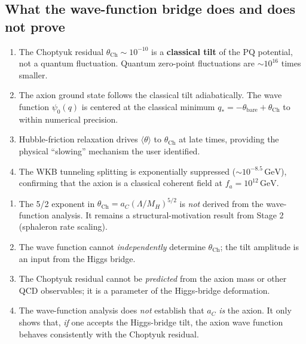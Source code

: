 \subsection{What the wave-function bridge does and does not prove}

\begin{keyfind}
\begin{enumerate}[leftmargin=*]
\item The Choptyuk residual $\theta_\mathrm{Ch} \sim 10^{-10}$ is a
\textbf{classical tilt} of the PQ potential, not a quantum
fluctuation.  Quantum zero-point fluctuations are $\sim 10^{16}$
times smaller.
\item The axion ground state follows the classical tilt
adiabatically.  The wave function $\psi_0(q)$ is centered at the
classical minimum $q_* = -\theta_\mathrm{bare} + \theta_\mathrm{Ch}$
to within numerical precision.
\item Hubble-friction relaxation drives $\langle \theta \rangle$
to $\theta_\mathrm{Ch}$ at late times, providing the physical
``slowing'' mechanism the user identified.
\item The WKB tunneling splitting is exponentially suppressed
($\sim 10^{-8.5}\,\mathrm{GeV}$), confirming that the axion is a
classical coherent field at $f_a = 10^{12}\,\mathrm{GeV}$.
\end{enumerate}
\end{keyfind}

\begin{caveat}
\begin{enumerate}[leftmargin=*]
\item The 5/2 exponent in $\theta_\mathrm{Ch} = a_C
(\Lambda/M_H)^{5/2}$ is \emph{not} derived from the wave-function
analysis.  It remains a structural-motivation result from Stage 2
(sphaleron rate scaling).
\item The wave function cannot \emph{independently} determine
$\theta_\mathrm{Ch}$; the tilt amplitude is an input from the
Higgs bridge.
\item The Choptyuk residual cannot be \emph{predicted} from the
axion mass or other QCD observables; it is a parameter of the
Higgs-bridge deformation.
\item The wave-function analysis does \emph{not} establish that
$a_C$ \emph{is} the axion.  It only shows that, \emph{if} one
accepts the Higgs-bridge tilt, the axion wave function behaves
consistently with the Choptyuk residual.
\end{enumerate}
\end{caveat}

